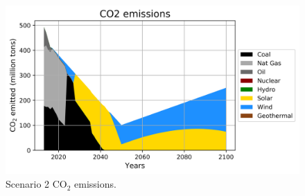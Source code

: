 \begin{frame}
  \begin{figure}[htbp!]
    \begin{center}
      \includegraphics[scale=0.6]{./images/conv_nonuc_co2}
    \end{center}
          \caption{Scenario 2 CO$_2$ emissions.}
    \label{s2c}
  \end{figure}

\end{frame}
